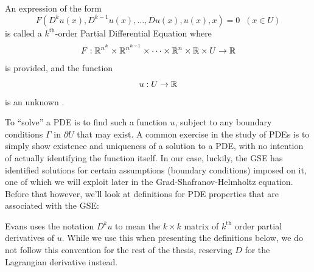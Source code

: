 \begin{definition}
    An expression of the form
    \begin{equation}
        \label{pde-definition}
        F(D^k u(x), D^{k-1} u(x), \dots, Du(x), u(x), x) = 0 \;\; (x \in U)
    \end{equation}
    is called a $k^{\text{th}}$-order Partial Differential Equation where 
    $$F : \mathbb{R}^{n^k} \times \mathbb{R}^{n^{k-1}} \times \dots \times \mathbb{R}^n \times \mathbb{R} \times U \to \mathbb{R}$$
    is provided, and the function
    $$u: U \to \mathbb{R}$$
    is an unknown \cite{evans-pdes}.
\end{definition}

To ``solve'' a PDE is to find such a function $u$, subject to any boundary conditions $\Gamma$ in $\partial U$ that may exist. A 
common exercise in the study of PDEs is to simply show existence and uniqueness of a solution to a PDE, with no 
intention of actually identifying the function itself. In our case, luckily, the GSE has identified solutions for 
certain assumptions (boundary conditions) imposed on it, one of which we will exploit later in the Grad-Shafranov-Helmholtz 
equation. Before that however, we'll look at definitions for PDE properties that are associated with the GSE:

\begin{notn}
    Evans uses the notation $D^{k} u$ to mean the $k \times k$ matrix of $k^{\text{th}}$ order partial derivatives of $u$.
    While we use this when presenting the definitions below, we do not follow this convention for the rest of the thesis,
    reserving $D$ for the Lagrangian derivative instead.
\end{notn}

